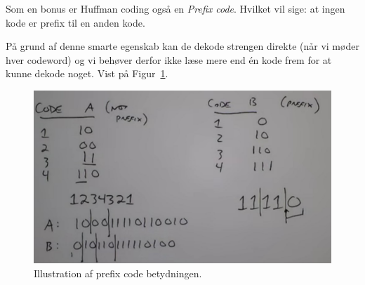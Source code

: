 Som en bonus er Huffman coding også en \textit{Prefix code}. Hvilket vil sige: at ingen kode er prefix til en anden kode. 

På grund af denne smarte egenskab kan de dekode strengen direkte (når vi møder hver codeword) og vi behøver derfor ikke læse mere end én kode frem for at kunne dekode noget. Vist på Figur~\ref{fig:prefix}.\\

\begin{figure}[H]
	\centering
	\includegraphics[width=0.9\linewidth]{figs/spm08/prefix}
	\caption{Illustration af prefix code betydningen.}
	\label{fig:prefix}
\end{figure}

